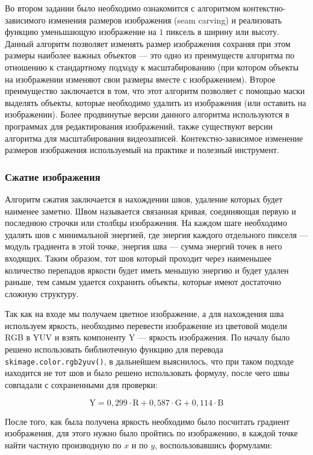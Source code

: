 \documentclass[12pt]{article}
\begin{document}
Во втором задании было необходимо ознакомится с алгоритмом контекстно-зависимого изменения размеров изображения (seam carving) и реализовать функцию уменьшающую изображение на $1$ пиксель в ширину или высоту. Данный алгоритм позволяет изменять размер изображения сохраняя при этом размеры наиболее важных объектов --- это одно из преимуществ алгоритма по отношению к стандартному подходу к масштабированию (при котором объекты на изображении изменяют свои размеры вместе с изображением). Второе преимущество заключается в том, что этот алгоритм позволяет с помощью маски выделять объекты, которые необходимо удалить из изображения (или оставить на изображении). Более продвинутые версии данного алгоритма используются в программах для редактирования изображений, также существуют версии алгоритма для масштабирования видеозаписей. Контекстно-зависимое изменение размеров изображения используемый на практике и полезный инструмент.

\subsubsection*{Сжатие изображения}

Алгоритм сжатия заключается в нахождении швов, удаление которых будет наименее заметно. Швом называется связанная кривая, соединяющая первую и последнюю строчки или столбцы изображения. На каждом шаге необходимо удалять шов с минимальной энергией, где энергия каждого отдельного пикселя --- модуль градиента в этой точке, энергия шва --- сумма энергий точек в него входящих. Таким образом, тот шов который проходит через наименьшее количество перепадов яркости будет иметь меньшую энергию и будет удален раньше, тем самым удается сохранить объекты, которые имеют достаточно сложную структуру.

Так как на входе мы получаем цветное изображение, а для нахождения шва используем яркость, необходимо перевести изображение из цветовой модели RGB в YUV и взять компоненту Y --- яркость изображения. По началу было решено использовать библиотечную функцию для перевода \texttt{skimage.color.rgb2yuv()}, в дальнейшем выяснилось, что при таком подходе находится не тот шов и было решено использовать формулу, после чего швы совпадали с сохраненными для проверки:

\[
\mathrm{Y} = 0,299 \cdot \mathrm{R} + 0,587 \cdot \mathrm{G} + 0,114 \cdot \mathrm{B}
\]

После того, как была получена яркость необходимо было посчитать градиент изображения, для этого нужно было пройтись по изображению, в каждой точке найти частную производную по $x$ и по $y$, воспользовавшись формулами:
\end{document}
